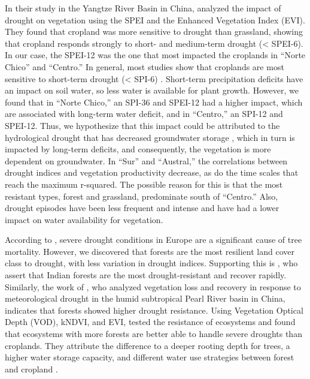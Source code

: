 \documentclass[
  authoryear,
  preprint,
  3p,
  onecolumn]{elsarticle}
\begin{document}
In their study in the Yangtze River Basin in China, \citet{Jiang2020}
analyzed the impact of drought on vegetation using the SPEI and the
Enhanced Vegetation Index (EVI). They found that cropland was more
sensitive to drought than grassland, showing that cropland responds
strongly to short- and medium-term drought (\textless{} SPEI-6). In our
case, the SPEI-12 was the one that most impacted the croplands in
``Norte Chico'' and ``Centro.'' In general, most studies show that
croplands are most sensitive to short-term drought (\textless{} SPI-6)
\citep{Zambrano2016, Potopova2015, Dai2020, Rhee2010}. Short-term
precipitation deficits have an impact on soil water, so less water is
available for plant growth. However, we found that in ``Norte Chico,''
an SPI-36 and SPEI-12 had a higher impact, which are associated with
long-term water deficit, and in ``Centro,'' an SPI-12 and SPEI-12. Thus,
we hypothesize that this impact could be attributed to the hydrological
drought that has decreased groundwater storage \citep{Taucare2024},
which in turn is impacted by long-term deficits, and consequently, the
vegetation is more dependent on groundwater. In ``Sur'' and ``Austral,''
the correlations between drought indices and vegetation productivity
decrease, as do the time scales that reach the maximum r-squared. The
possible reason for this is that the most resistant types, forest and
grassland, predominate south of ``Centro.'' Also, drought episodes have
been less frequent and intense and have had a lower impact on water
availability for vegetation.

According to \citet{Senf2020}, severe drought conditions in Europe are a
significant cause of tree mortality. However, we discovered that forests
are the most resilient land cover class to drought, with less variation
in drought indices. Supporting this is \citet{Fathi-Taperasht2022}, who
assert that Indian forests are the most drought-resistant and recover
rapidly. Similarly, the work of \citet{Wu2024}, who analyzed vegetation
loss and recovery in response to meteorological drought in the humid
subtropical Pearl River basin in China, indicates that forests showed
higher drought resistance. Using Vegetation Optical Depth (VOD), kNDVI,
and EVI, \citet{Xiao2023} tested the resistance of ecosystems and found
that ecosystems with more forests are better able to handle severe
droughts than croplands. They attribute the difference to a deeper
rooting depth for trees, a higher water storage capacity, and different
water use strategies between forest and cropland \citep{Xiao2023}.
\end{document}
